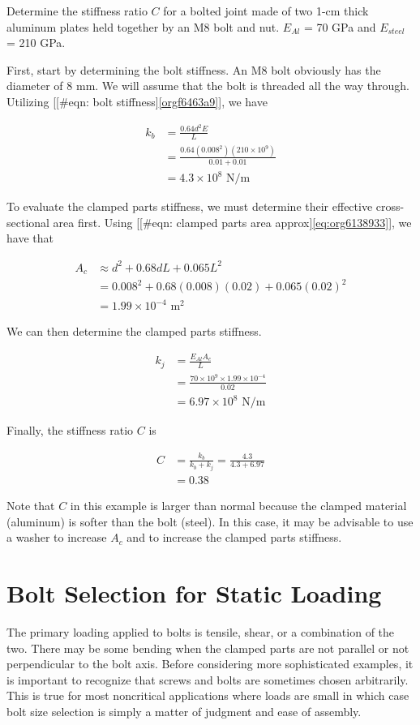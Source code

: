 \documentclass[a4paper,openany,12pt]{book}
\begin{document}
{{Determine the stiffness ratio \(C\) for a bolted joint made of two 1-cm
thick aluminum plates held together by an M8 bolt and nut. \(E_{Al}\) = 70
GPa and \(E_{steel}\) = 210 GPa.

First, start by determining the bolt stiffness. An M8 bolt obviously has
the diameter of 8 mm. We will assume that the bolt is threaded all the
way through. Utilizing [[\#eqn: bolt stiffness]\ref{orgf6463a9}],
we have

$$\begin{aligned}
    k_b &= \frac{0.64d^2E}{L} \\
        &= \frac{0.64 (0.008^2)(210 \times 10^9)}{0.01+0.01} \\
        &= 4.3 \times 10^8 \text{ N/m}
  \end{aligned}$$

To evaluate the clamped parts stiffness, we must determine their
effective cross-sectional area first. Using
[[\#eqn: clamped parts area approx]\ref{eq:org6138933}],
we have that

$$\begin{aligned}
    A_c &\approx d^2 + 0.68dL + 0.065L^2 \\
        &= 0.008^2 + 0.68(0.008)(0.02) + 0.065(0.02)^2 \\
        &= 1.99 \times 10^{-4} \text{ m}^2
  \end{aligned}$$

We can then determine the clamped parts stiffness.

$$\begin{aligned}
    k_j &= \frac{E_{Al}A_c}{L} \\
        &= \frac{70 \times 10^9 \times 1.99 \times 10^{-4}}{0.02} \\
        &= 6.97 \times 10^8 \text{ N/m}
  \end{aligned}$$

Finally, the stiffness ratio \(C\) is

$$\begin{aligned}
    C & = \frac{k_b}{k_b + k_j} = \frac{4.3}{4.3 + 6.97} \\
      &= 0.38
  \end{aligned}$$

Note that \(C\) in this example is larger than normal because the clamped
material (aluminum) is softer than the bolt (steel). In this case, it
may be advisable to use a washer to increase \(A_c\) and to increase the
clamped parts stiffness.

\section{Bolt Selection for Static Loading}
\label{sec:org542e6c8}
The primary loading applied to bolts is tensile, shear, or a combination
of the two. There may be some bending when the clamped parts are not
parallel or not perpendicular to the bolt axis. Before considering more
sophisticated examples, it is important to recognize that screws and
bolts are sometimes chosen arbitrarily. This is true for most
noncritical applications where loads are small in which case bolt size
selection is simply a matter of judgment and ease of assembly.

}}
\end{document}
